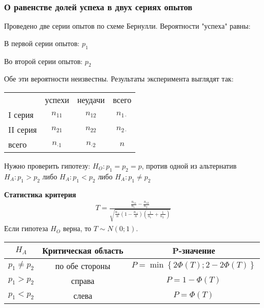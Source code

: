 \documentclass[12pt]{extarticle}
\begin{document}
\subsubsection{О равенстве долей успеха в двух сериях опытов}
Проведено две серии опытов по схеме Бернулли. Вероятности "успеха"
равны:
\begin{description}
    \item В первой серии опытов: $p_{1}$
    \item Во второй серии опытов: $p_{2}$
\end{description}
Обе эти вероятности неизвестны. Результаты эксперимента выглядят так:
\begin{center}\begin{tabular}{l|c|c|c}
             & успехи & неудачи & всего \\
    I серия  & $n_{11}$ & $n_{12}$ & $n_{1\cdot}$\\\hline
    II серия & $n_{21}$ & $n_{22}$ & $n_{2\cdot}$\\\hline
    всего    & $n_{\cdot 1}$ & $n_{\cdot 2}$ & $n$
\end{tabular}
\end{center}
Нужно проверить гипотезу: $H_{O}: p_{1}=p_{2}=p$, против одной из
альтернатив $H_{A}:p_{1}>p_{2}$ либо $H_{A}:p_{1}<p_{2}$ либо
$H_{A}:p_{1}\neq p_{2}$

\par\textbf{Статистика критерия}
\begin{eqnarray*}
T=\frac
{\frac{n_{11}}{n_{1\cdot}}-\frac{n_{12}}{n_{2\cdot}}}
{\sqrt{\frac{n_{\cdot 1}}{n}
        (1-\frac{n_{\cdot 1}}{n})
    (\frac{1}{n_{1\cdot}}+\frac{1}{n_{2\cdot}})
}}
\end{eqnarray*}
Если гипотеза $H_{O}$ верна, то $T\sim N(0;1)$.
\begin{center} \begin{tabular}{c|c|c}
    $H_{A}$ & Критическая область & P-значение \\\hline
    $p_{1}\neq p_{2}$ & по обе стороны &
    $P=\min\left\{2\Phi(T);2-2\Phi(T)\right\}$\\\hline
    $p_{1}>p_{2}$ & справа & $P=1-\Phi(T)$ \\\hline
    $p_{1}<p_{2}$ & слева & $P=\Phi(T)$ \\
\end{tabular} \end{center}
\end{document}
